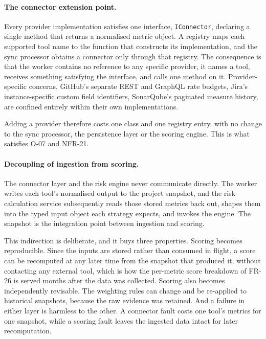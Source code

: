 \paragraph{The connector extension point.}
Every provider implementation satisfies one interface, \texttt{IConnector},
declaring a single method that returns a normalised metric object. A registry maps
each supported tool name to the function that constructs its implementation, and
the sync processor obtains a connector only through that registry. The
consequence is that the worker contains no reference to any specific provider, 
it names a tool, receives something satisfying the interface, and calls one method
on it. Provider-specific concerns, GitHub's separate REST and GraphQL rate
budgets, Jira's instance-specific custom field identifiers, SonarQube's paginated
measure history, are confined entirely within their own implementations.

Adding a provider therefore costs one class and one registry entry, with no
change to the sync processor, the persistence layer or the scoring engine. This
is what satisfies O-07 and NFR-21.

\paragraph{Decoupling of ingestion from scoring.}
The connector layer and the risk engine never communicate directly. The worker
writes each tool's normalised output to the project snapshot, and the risk
calculation service subsequently reads those stored metrics back out, shapes them
into the typed input object each strategy expects, and invokes the engine. The
snapshot is the integration point between ingestion and scoring.

This indirection is deliberate, and it buys three properties. Scoring becomes
reproducible. Since the inputs are stored rather than consumed in flight, a
score can be recomputed at any later time from the snapshot that produced it,
without contacting any external tool, which is how the per-metric score
breakdown of FR-26 is served months after the data was collected. Scoring also
becomes independently revisable. The weighting rules can change and be re-applied
to historical snapshots, because the raw evidence was retained. And a failure in
either layer is harmless to the other. A connector fault costs one tool's metrics for one
snapshot, while a scoring fault leaves the ingested data intact for later
recomputation.

